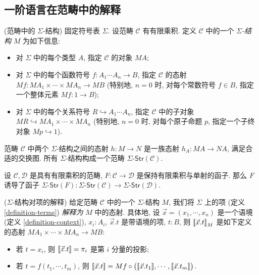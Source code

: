 \subsection{一阶语言在范畴中的解释}

\begin{definition}
	[label={sigma-structures-in-category}]
	{(范畴中的 $\Sigma$-结构)}
	固定符号表 $\Sigma$. 设范畴 $\mathcal C$ 有有限乘积.
	定义 $\mathcal C$ 中的一个 \emph{$\Sigma$-结构} $M$ 为如下信息:
	\begin{itemize}
		\item 对 $\Sigma$ 中的每个类型 $A$, 指定 $\mathcal C$ 的对象 $MA$;
		\item 对 $\Sigma$ 中的每个函数符号 $f\colon A_1\cdots A_n \to B$, 指定 $\mathcal C$ 的态射
		$Mf \colon MA_1\times\cdots\times MA_n \to MB$ (特别地, $n=0$ 时, 对每个常数符号 $f\in B$, 指定一个整体元素 $Mf\colon 1\to B$);
		\item 对 $\Sigma$ 中的每个关系符号 $R \hookrightarrow A_1\cdots A_n$, 指定 $\mathcal C$ 中的子对象
		$MR \hookrightarrow MA_1\times\cdots\times MA_n$ (特别地, $n=0$ 时, 对每个原子命题 $p$, 指定一个子终对象 $Mp\hookrightarrow 1$).
	\end{itemize}
	
	范畴 $\mathcal C$ 中两个 $\Sigma$-结构之间的态射 $h\colon M\to N$ 是一族态射 $h_A \colon MA \to NA$, 满足合适的交换图. 所有 $\Sigma$-结构构成一个范畴 $\Sigma\text{-}\mathsf{Str}(\mathcal C)$.
	
\end{definition}

\begin{prop}
	{}
	设 $\mathcal C,\mathcal D$ 是具有有限乘积的范畴,
	$F \colon \mathcal C \to \mathcal D$ 是保持有限乘积与单射的函子. 那么 $F$ 诱导了函子
	$\Sigma\text{-}\mathsf{Str}(F)\colon \Sigma\text{-}\mathsf{Str}(\mathcal C) \to \Sigma\text{-}\mathsf{Str}(\mathcal D)$.
\end{prop}


\begin{definition}
	[label={term-interpretation}]
	{($\Sigma$-结构对项的解释)}
	给定范畴 $\mathcal C$ 中的一个 $\Sigma$-结构 $M$, 我们将 $\Sigma$ 上的项 (定义 \ref{definition-terms}) \emph{解释为} $M$ 中的态射.
	具体地, 设 $\vec x = (x_1,\cdots,x_n)$ 是一个语境 (定义 \ref{definition-context}), $x_i\colon A_i$,
	$\vec x.t$ 是带语境的项, $t\colon B$, 则 ${[\![\vec x.t]\!]}_M$ 是如下定义的态射 $MA_1\times\cdots\times MA_n\to MB$:
	\begin{itemize}
		\item 若 $t=x_i$, 则 ${[\![\vec x.t]\!]} = \pi_i$ 是第 $i$ 分量的投影;
		\item 若 $t = f(t_1,\cdots,t_m)$, 则
		${[\![\vec x.t]\!]} = Mf \circ \big({[\![\vec x.t_1]\!]},\cdots,{[\![\vec x.t_m]\!]}\big)$.
	\end{itemize}
\end{definition}

